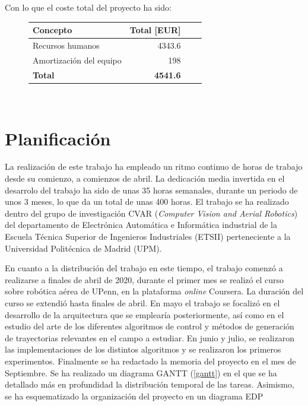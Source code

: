 Con lo que el coste total del proyecto ha sido:

\begin{figure}[htb!]
	\centering
	\begin{tabular}{|l|r|r|r|}
		\hline
		\textbf{Concepto} &Total [EUR]\\
		\hline
		Recursos humanos & 4343.6\\
		Amortización del equipo & 198\\
		
		\hline
		\textbf{Total}   & \textbf{4541.6}\\
		\hline
	\end{tabular}\\
\end{figure}




\newpage
\section{Planificación}
La realización de este trabajo ha empleado un ritmo continuo de horas de trabajo desde su comienzo, a comienzos de abril. La dedicación media invertida en el desarrolo del trabajo ha sido de unas 35 horas semanales, durante un periodo de unos 3 meses, lo que da un total de unas 400 horas. El trabajo se ha realizado dentro del grupo de investigación CVAR (\textit{Computer Vision and Aerial Robotics}) del departamento de Electrónica Automática e Informática industrial de la Escuela Técnica Superior de Ingenieros Industriales (ETSII) perteneciente a la Universidad Politécnica de Madrid (UPM).

En cuanto a la distribución del trabajo en este tiempo, el trabajo comenzó a realizarse a finales de abril de 2020, durante el primer mes se realizó el curso sobre robótica aérea de UPenn, en la plataforma \textit{online} Coursera. La duración del curso se extendió hasta finales de abril. En mayo el trabajo se focalizó en el desarrollo de la arquitectura que se emplearía posteriormente, así como en el estudio del arte de los diferentes algoritmos de control y métodos de generación de trayectorias relevantes en el campo a estudiar. En junio y julio, se realizaron las implementaciones de los distintos algoritmos y se realizaron los primeros experimentos. Finalmente se ha redactado la memoria del proyecto en el mes de Septiembre. Se ha realizado un diagrama GANTT (\cref{gantt}) en el que se ha detallado más en profundidad la distribución temporal de las tareas. Asimismo, se ha esquematizado la organización del proyecto en un diagrama EDP 


